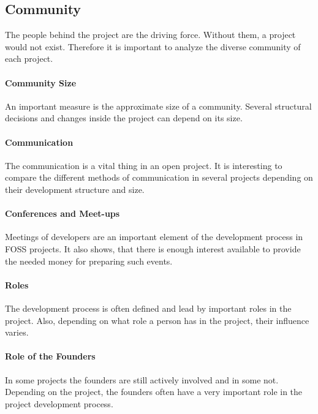 \subsection{Community}

The people behind the project are the driving force. Without them, a project
would not exist. Therefore it is important to analyze the diverse community of
each project.

\paragraph{Community Size}

An important measure is the approximate size of a community. Several structural
decisions and changes inside the project can depend on its size.

\paragraph{Communication}

The communication is a vital thing in an open project. It is interesting to
compare the different methods of communication in several projects depending on
their development structure and size.

\paragraph{Conferences and Meet-ups}

Meetings of developers are an important element of the development process in
\ac{FOSS} projects. It also shows, that there is enough interest available to
provide the needed money for preparing such events.

\paragraph{Roles}

The development process is often defined and lead by important roles in the
project. Also, depending on what role a person has in the project, their
influence varies.

\paragraph{Role of the Founders}

In some projects the founders are still actively involved and in some not.
Depending on the project, the founders often have a very important role in the
project development process.


